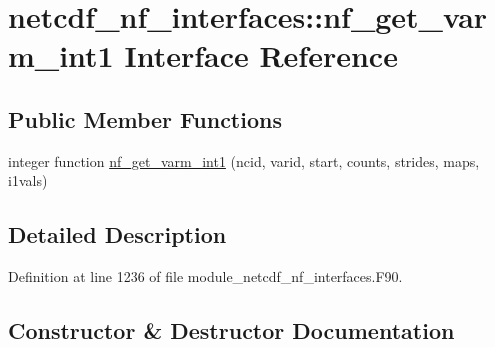 \hypertarget{interfacenetcdf__nf__interfaces_1_1nf__get__varm__int1}{}\section{netcdf\+\_\+nf\+\_\+interfaces\+:\+:nf\+\_\+get\+\_\+varm\+\_\+int1 Interface Reference}
\label{interfacenetcdf__nf__interfaces_1_1nf__get__varm__int1}
\subsection*{Public Member Functions}
\begin{DoxyCompactItemize}
\item 
integer function \hyperlink{interfacenetcdf__nf__interfaces_1_1nf__get__varm__int1_ab5d146049c52981510289f3a886e3732}{nf\+\_\+get\+\_\+varm\+\_\+int1} (ncid, varid, start, counts, strides, maps, i1vals)
\end{DoxyCompactItemize}


\subsection{Detailed Description}


Definition at line 1236 of file module\+\_\+netcdf\+\_\+nf\+\_\+interfaces.\+F90.



\subsection{Constructor \& Destructor Documentation}
\mbox{\label{interfacenetcdf__nf__interfaces_1_1nf__get__varm__int1_ab5d146049c52981510289f3a886e3732}} 
